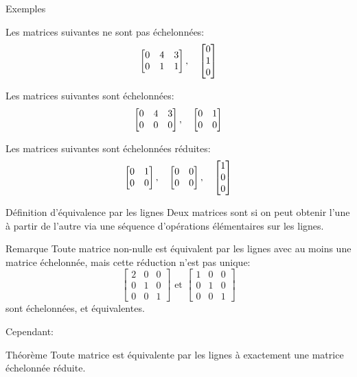 \documentclass{article}
\begin{document}
\begin{parag}{Exemples}

    Les matrices suivantes ne sont pas échelonnées:
    \[\begin{bmatrix} 0 & 4 & 3 \\ 0 & 1 & 1 \end{bmatrix}, \quad \begin{bmatrix} 0 \\ 1 \\ 0 \end{bmatrix} \]


    Les matrices suivantes sont échelonnées:
    \[\begin{bmatrix} 0 & 4 & 3 \\ 0 & 0 & 0 \end{bmatrix}, \quad \begin{bmatrix} 0 & 1 \\ 0 & 0 \end{bmatrix} \]

    Les matrices suivantes sont échelonnées réduites:
    \[\begin{bmatrix} 0 & 1 \\ 0 & 0 \end{bmatrix}, \quad \begin{bmatrix} 0 & 0 \\ 0 & 0 \end{bmatrix}, \quad \begin{bmatrix} 1 \\ 0 \\ 0 \end{bmatrix} \]
\end{parag}


\begin{parag}{Définition d'équivalence par les lignes}
    Deux matrices sont  si on peut obtenir l'une à partir de l'autre via une séquence d'opérations élémentaires sur les lignes.

    \begin{subparag}{Remarque}
        Toute matrice non-nulle est équivalent par les lignes avec au moins une matrice échelonnée, mais cette réduction n'est pas unique:
        \[\begin{bmatrix} 2 & 0 & 0 \\ 0 & 1 & 0 \\ 0 & 0 & 1 \end{bmatrix} \text{ et } \begin{bmatrix} 1 & 0 & 0 \\ 0 & 1 & 0 \\ 0 & 0 & 1 \end{bmatrix} \]
        sont échelonnées, et équivalentes.
    \end{subparag}

    Cependant:

    \begin{subparag}{Théorème}
        Toute matrice est équivalente par les lignes à exactement une matrice échelonnée réduite.
    \end{subparag}

\end{parag}
\end{document}
